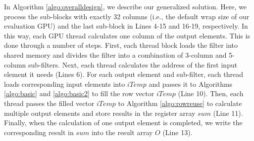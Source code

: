  In Algorithm \ref{algo:overalldesign}, we describe our generalized solution. Here, we process the sub-blocks with
exactly 32 columns (i.e., the default wrap size of our evaluation GPU) and the last sub-block in Lines 4-15 and 16-19, respectively. In
this way, each GPU thread calculates one column of the output elements. This is done through a number of steps. First, each thread block
loads the filter into shared memory and divides the filter into a combination of 3-column and 5-column sub-filters. Next, each thread
calculates the address of the first input element it needs (Lines 6). For each output element and sub-filter, each thread loads
corresponding input elements into $iTemp$ and passes it to Algorithms \ref{algo:basic} and \ref{algo:basic2} to fill the row vector $iTemp$
(Line 10). Then, each thread passes the filled vector $iTemp$ to Algorithm \ref{algo:rowreuse} to calculate multiple output elements and
store results in the register array $sum$ (Line 11). Finally, when the calculation of one output element is completed, we write the
corresponding result in $sum$ into the result array $O$ (Line 13).
